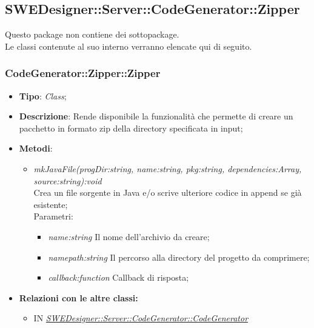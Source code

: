 \documentclass[../DefinizioneDiProdotto.tex]{subfiles}
\begin{document}
			
			
			
			
			\subsection{SWEDesigner::Server::CodeGenerator::Zipper}
			Questo package non contiene dei sottopackage.\\
			Le classi contenute al suo interno verranno elencate qui di seguito.
			
			\subsubsection{CodeGenerator::Zipper::Zipper}
			\hypertarget{SWEDesigner::Server::CodeGenerator::Builder::Builder}{}
			\begin{itemize}
				\item \textbf{Tipo}: \emph{Class};
				\item \textbf{Descrizione}: Rende disponibile la funzionalità che permette di creare un pacchetto in formato zip della directory specificata in input; \\
				\item \textbf{Metodi}:
				\begin{itemize}
					\item \emph{mkJavaFile(progDir:string, name:string, pkg:string, dependencies:Array, source:string):void} \\ 
					Crea un file sorgente in Java e/o scrive ulteriore codice in append se già esistente; \\
					Parametri:
					\begin{itemize}
						\item \emph{name:string} Il nome dell'archivio da creare;
						\item \emph{namepath:string} Il percorso alla directory del progetto da comprimere;
						\item \emph{callback:function} Callback di risposta;
					\end{itemize}
				\end{itemize}
				
				\item \textbf{Relazioni con le altre classi:}
				\begin{itemize}
					\item IN \hyperlink{SWEDesigner::Server::CodeGenerator::CodeGenerator}{\emph{SWEDesigner::Server::CodeGenerator::CodeGenerator}}
				\end{itemize}	
			\end{itemize}
			
\end{document}
